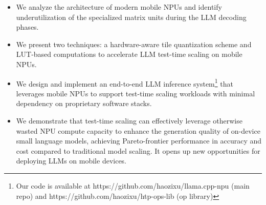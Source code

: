 \begin{itemize}
    \item We analyze the architecture of modern mobile NPUs and identify underutilization of the specialized matrix units during the LLM decoding phases.
    \item We present two techniques: a hardware-aware tile quantization scheme and LUT-based computations to accelerate LLM test-time scaling on mobile NPUs.
    \item We design and implement an end-to-end LLM inference system\footnote{Our code is available at https://github.com/haozixu/llama.cpp-npu (main repo) and https://github.com/haozixu/htp-ops-lib (op library)} that leverages mobile NPUs to support test-time scaling workloads with minimal dependency on proprietary software stacks.
    \item We demonstrate that test-time scaling can effectively leverage otherwise wasted NPU compute capacity to enhance the generation quality of on-device small language models, achieving Pareto-frontier performance in accuracy and cost compared to traditional model scaling. It opens up new opportunities for deploying LLMs on mobile devices.
\end{itemize}
